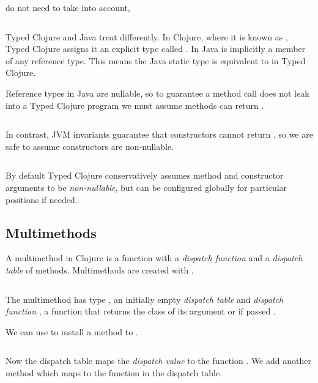 do not need to take  into account, 

\begin{exmp}
\inputminted[firstline=18,lastline=19]{clojure}{code/demo/src/demo/parent3.clj}
\end{exmp}

Typed Clojure and Java treat  differently.
In Clojure, where it is known as , Typed Clojure assigns it an explicit type
called . In Java  is implicitly a member of any reference type.
This means the Java static type  is equivalent to
 in Typed Clojure.

Reference types in Java are nullable, so to guarantee a method call does not
leak  into a Typed Clojure program we
must assume methods can return .

\begin{exmp}
\inputminted[firstline=6,lastline=8]{clojure}{code/demo/src/demo/parent3.clj}
\end{exmp}

In contrast, JVM invariants guarantee that  constructors cannot return ,
so we are safe to assume constructors are non-nullable.

\begin{exmp}
\inputminted[firstline=15,lastline=16]{clojure}{code/demo/src/demo/parent3.clj}
\end{exmp}

By default Typed Clojure conservatively assumes method and constructor arguments to be \emph{non-nullable},
but can be configured globally for particular positions if needed.

\subsection{Multimethods}

\label{sec:multioverview}

A multimethod in Clojure is a function with a \emph{dispatch
function} and a \emph{dispatch table} of methods. Multimethods are created with {}.
\inputminted[firstline=5,lastline=6]{clojure}{code/demo/src/demo/rep.clj}
The multimethod  has type , an initially empty \emph{dispatch table}
and \emph{dispatch function} , a function that
returns the class of its argument or  if passed .

We can use {} to install a method to .
\inputminted[firstline=7,lastline=7]{clojure}{code/demo/src/demo/rep.clj}
Now the dispatch table maps
the \emph{dispatch value}  to the function
. 
We add another method
which maps
 to the function
in the dispatch table.
\inputminted[firstline=8,lastline=8]{clojure}{code/demo/src/demo/rep.clj}

